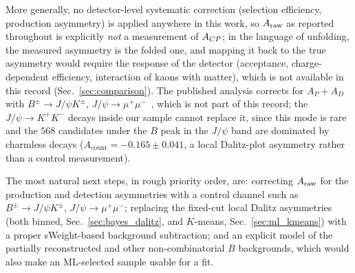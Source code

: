 More generally, no detector-level systematic correction (selection efficiency, production asymmetry) is applied anywhere in this work, so $A_{\mathrm{raw}}$ as reported throughout is explicitly \emph{not} a measurement of $A_{CP}$; in the language of unfolding, the measured asymmetry is the folded one, and mapping it back to the true asymmetry would require the response of the detector (acceptance, charge-dependent efficiency, interaction of kaons with matter), which is not available in this record (Sec.~\ref{sec:comparison}). The published analysis corrects for $A_P+A_D$ with $B^\pm\to J/\psi K^\pm$, $J/\psi\to\mu^+\mu^-$~\cite{lhcb_cpv_prd2023}, which is not part of this record; the $J/\psi\to K^+K^-$ decays inside our sample cannot replace it, since this mode is rare and the $568$ candidates under the $B$ peak in the $J/\psi$ band are dominated by charmless decays ($A_{\mathrm{count}}=-0.165\pm0.041$, a local Dalitz-plot asymmetry rather than a control measurement).

The most natural next steps, in rough priority order, are: correcting $A_{\mathrm{raw}}$ for the production and detection asymmetries with a control channel such as $B^\pm\to J/\psi K^\pm$, $J/\psi\to\mu^+\mu^-$; replacing the fixed-cut local Dalitz asymmetries (both binned, Sec.~\ref{sec:bayes_dalitz}, and $K$-means, Sec.~\ref{sec:ml_kmeans}) with a proper sWeight-based background subtraction; and an explicit model of the partially reconstructed and other non-combinatorial $B$ backgrounds, which would also make an ML-selected sample usable for a fit.
